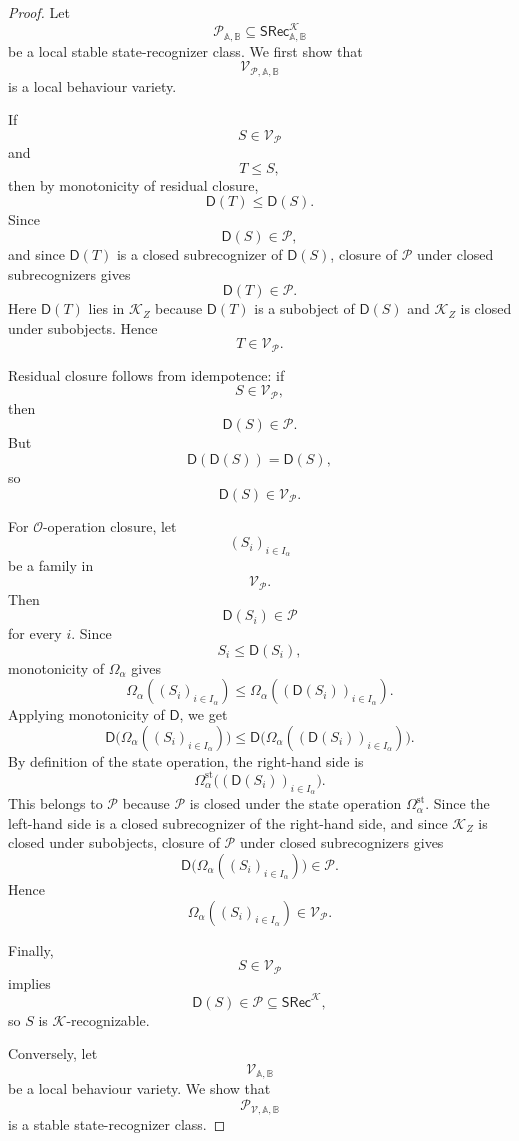 \begin{proof}
Let
\[
\mathcal P_{\mathbb A,\mathbb B}
\subseteq
\mathsf{SRec}^{\mathcal K}_{\mathbb A,\mathbb B}
\]
be a local stable state-recognizer class. We first show that
\[
\mathcal V_{\mathcal P,\mathbb A,\mathbb B}
\]
is a local behaviour variety.

If
\[
S\in\mathcal V_{\mathcal P}
\]
and
\[
T\leq S,
\]
then by monotonicity of residual closure,
\[
\mathsf D(T)\leq\mathsf D(S).
\]
Since
\[
\mathsf D(S)\in\mathcal P,
\]
and since \(\mathsf D(T)\) is a closed subrecognizer of \(\mathsf D(S)\),
closure of \(\mathcal P\) under closed subrecognizers gives
\[
\mathsf D(T)\in\mathcal P.
\]
Here \(\mathsf D(T)\) lies in \(\mathcal K_Z\) because \(\mathsf D(T)\) is a
subobject of \(\mathsf D(S)\) and \(\mathcal K_Z\) is closed under
subobjects. Hence
\[
T\in\mathcal V_{\mathcal P}.
\]

Residual closure follows from idempotence:
if
\[
S\in\mathcal V_{\mathcal P},
\]
then
\[
\mathsf D(S)\in\mathcal P.
\]
But
\[
\mathsf D(\mathsf D(S))=\mathsf D(S),
\]
so
\[
\mathsf D(S)\in\mathcal V_{\mathcal P}.
\]

For \(\mathcal O\)-operation closure, let
\[
(S_i)_{i\in I_\alpha}
\]
be a family in
\[
\mathcal V_{\mathcal P}.
\]
Then
\[
\mathsf D(S_i)\in\mathcal P
\]
for every \(i\). Since
\[
S_i\leq\mathsf D(S_i),
\]
monotonicity of \(\Omega_\alpha\) gives
\[
\Omega_\alpha((S_i)_{i\in I_\alpha})
\leq
\Omega_\alpha((\mathsf D(S_i))_{i\in I_\alpha}).
\]
Applying monotonicity of \(\mathsf D\), we get
\[
\mathsf D\bigl(\Omega_\alpha((S_i)_{i\in I_\alpha})\bigr)
\leq
\mathsf D\bigl(\Omega_\alpha((\mathsf D(S_i))_{i\in I_\alpha})\bigr).
\]
By definition of the state operation, the right-hand side is
\[
\Omega_\alpha^{\mathrm{st}}
\bigl((\mathsf D(S_i))_{i\in I_\alpha}\bigr).
\]
This belongs to \(\mathcal P\) because \(\mathcal P\) is closed under the
state operation \(\Omega_\alpha^{\mathrm{st}}\). Since the left-hand side is
a closed subrecognizer of the right-hand side, and since \(\mathcal K_Z\) is
closed under subobjects, closure of \(\mathcal P\) under closed
subrecognizers gives
\[
\mathsf D\bigl(\Omega_\alpha((S_i)_{i\in I_\alpha})\bigr)
\in\mathcal P.
\]
Hence
\[
\Omega_\alpha((S_i)_{i\in I_\alpha})\in\mathcal V_{\mathcal P}.
\]

Finally,
\[
S\in\mathcal V_{\mathcal P}
\]
implies
\[
\mathsf D(S)\in\mathcal P\subseteq
\mathsf{SRec}^{\mathcal K},
\]
so \(S\) is \(\mathcal K\)-recognizable.

Conversely, let
\[
\mathcal V_{\mathbb A,\mathbb B}
\]
be a local behaviour variety. We show that
\[
\mathcal P_{\mathcal V,\mathbb A,\mathbb B}
\]
is a stable state-recognizer class.


\end{proof}
